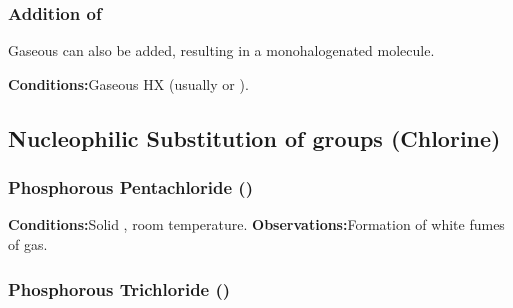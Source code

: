 			\subsubsection{Addition of }

				Gaseous  can also be added, resulting in a monohalogenated molecule.

				\vspace{1.5em}
				\vbox{\textbf{Conditions:}\tabto{35mm}Gaseous HX (usually  or ).}


		\pagebreak
		\hypertarget{NSubAlcohols}{}
		\subsection{Nucleophilic Substitution of  groups (Chlorine)}

			\subsubsection{Phosphorous Pentachloride ()}

				\vspace{1.5em}
				\vbox{\textbf{Conditions:}\tabto{35mm}Solid , room temperature.}
				\vbox{\textbf{Observations:}\tabto{35mm}Formation of white fumes of  gas.}



			\subsubsection{Phosphorous Trichloride ()}

